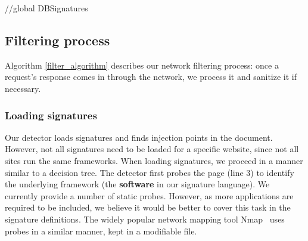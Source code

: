 \begin{algorithm} 
	\SetAlgoLined
	//global DBSignatures\\
\end{algorithm}

\subsection{Filtering process} \label{filtering_process}
Algorithm \ref{filter_algorithm} describes our network filtering process: once a request's response comes in through the network, we process it and sanitize it if necessary.

\subsubsection{Loading signatures} \label{loading_signatures}
Our detector loads signatures and finds injection points in the document. However, not all signatures need to be loaded for a specific website, since not all sites run the same frameworks. When loading signatures, we proceed in a manner similar to a decision tree. The detector first probes the page (line 3) to identify the underlying framework (the \textbf{software} in our signature language). We currently provide a number of static probes. However, as more applications are required to be included, we believe it would be better to cover this task in the signature definitions. The widely popular network mapping tool Nmap~\cite{nMap} uses probes in a similar manner, kept in a modifiable file.

